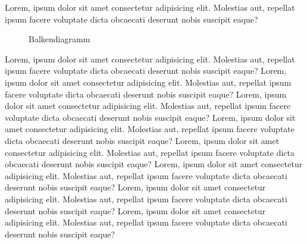 \documentclass[10pt,a4paper,twoside]{article}
\begin{document}
    \nocite{*}

    \tableofcontents\label{Inhaltsverzeichnis}

    \newpage

    Lorem, ipsum dolor sit amet consectetur adipisicing elit. Molestias aut, repellat ipsum facere voluptate dicta obcaecati deserunt nobis suscipit eaque?
    \begin{wrapfigure}{l}{0.5\textwidth}
        \centering
        \caption{Balkendiagramm}
    \end{wrapfigure}
    Lorem, ipsum dolor sit amet consectetur adipisicing elit. Molestias aut, repellat ipsum facere voluptate dicta obcaecati deserunt nobis suscipit eaque?
    Lorem, ipsum dolor sit amet consectetur adipisicing elit. Molestias aut, repellat ipsum facere voluptate dicta obcaecati deserunt nobis suscipit eaque?
    Lorem, ipsum dolor sit amet consectetur adipisicing elit. Molestias aut, repellat ipsum facere voluptate dicta obcaecati deserunt nobis suscipit eaque?
    Lorem, ipsum dolor sit amet consectetur adipisicing elit. Molestias aut, repellat ipsum facere voluptate dicta obcaecati deserunt nobis suscipit eaque?
    Lorem, ipsum dolor sit amet consectetur adipisicing elit. Molestias aut, repellat ipsum facere voluptate dicta obcaecati deserunt nobis suscipit eaque?
    Lorem, ipsum dolor sit amet consectetur adipisicing elit. Molestias aut, repellat ipsum facere voluptate dicta obcaecati deserunt nobis suscipit eaque?
    Lorem, ipsum dolor sit amet consectetur adipisicing elit. Molestias aut, repellat ipsum facere voluptate dicta obcaecati deserunt nobis suscipit eaque?
    Lorem, ipsum dolor sit amet consectetur adipisicing elit. Molestias aut, repellat ipsum facere voluptate dicta obcaecati deserunt nobis suscipit eaque?
\end{document}
